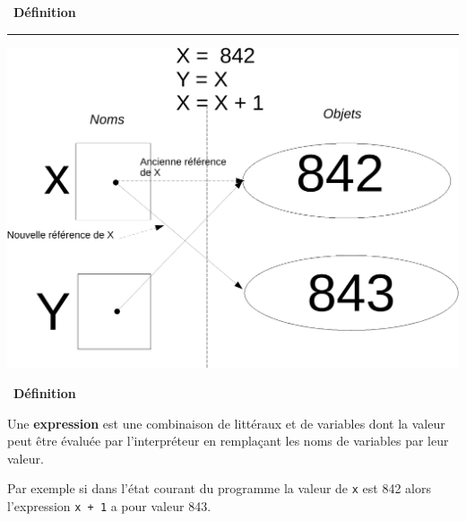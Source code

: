 \documentclass[a4paper, french, 12pt]{article}  %
\newcounter{def}
\newenvironment{definition}[1]
{\par \medskip   \addtocounter{def}{1} \noindent  
\begin{bclogo}[arrondi =0.1,  ombre = true, barre=none, logo=\bcbook, marge=4]{~\textbf{Définition} \textbf{\thedef} {\itshape #1} }  \par}
{
\end{bclogo}
 \par \bigskip }
\newcounter{prog}
\begin{document}
\begin{definition}{}
\hrule

\begin{center}
\includegraphics[scale=0.4]{ressources/affectation3-crop.pdf}
\end{center}


\end{definition}



\begin{definition}{}
Une \textbf{expression} est une combinaison de littéraux et de variables dont la valeur peut être évaluée par l'interpréteur en remplaçant les noms de variables par leur valeur.

Par exemple si dans l'état courant du  programme la valeur de \texttt{x} est 842 alors l'expression  \texttt{x + 1} a pour valeur 843.



\end{definition}
\end{document}
